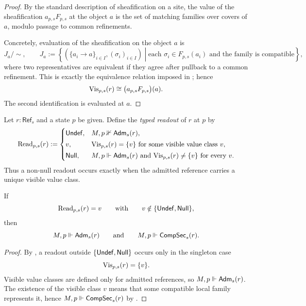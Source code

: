 \begin{proof}
By the standard description of sheafification on a site, the value of the sheafification $a_{p,s}F_{p,s}$ at the object $a$ is the set of matching families over covers of $a$, modulo passage to common refinements.

Concretely, evaluation of the sheafification on the object $a$ is
\[
J_a/\!\sim,\qquad
J_a:=\left\{\left(\{a_i\to a\}_{i\in I},(\sigma_i)_{i\in I}\right)\middle|\text{each }\sigma_i\in F_{p,s}(a_i)\text{ and the family is compatible}\right\},
\]
where two representatives are equivalent if they agree after pullback to a common refinement.
This is exactly the equivalence relation imposed in ; hence
\[
\mathrm{Vis}_{p,s}(r)\cong \bigl(a_{p,s}F_{p,s}\bigr)(a).
\]
The second identification is  evaluated at $a$.
\end{proof}


\begin{definition}\label{def:typed-readout}
Let $r:\mathsf{Ref}_s$ and a state $p$ be given. Define the \emph{typed readout} of $r$ at $p$ by
\[
\Read_{p,s}(r):=
\begin{cases}
\Undef, & M,p\nVdash \Adm_s(r),\\[0.5ex]
v, & \Vis_{p,s}(r)=\{v\}\ \text{for some visible value class }v,\\[0.5ex]
\Null, & M,p\Vdash \Adm_s(r)\ \text{and}\ \Vis_{p,s}(r)\neq\{v\}\ \text{for every }v.
\end{cases}
\]
Thus a non-null readout occurs exactly when the admitted reference carries a unique visible value class.
\end{definition}

\begin{proposition}\label{prop:address-before-value}
If
\[
\mathrm{Read}_{p,s}(r)=v
\qquad\text{with}\qquad
v\notin\{\mathsf{Undef},\mathsf{Null}\},
\]
then
\[
M,p\Vdash \mathsf{Adm}_s(r)
\qquad\text{and}\qquad
M,p\Vdash \mathsf{CompSec}_s(r).
\]
\end{proposition}

\begin{proof}
By , a readout outside $\{\mathsf{Undef},\mathsf{Null}\}$ occurs only in the singleton case
\[
\mathrm{Vis}_{p,s}(r)=\{v\}.
\]
Visible value classes are defined only for admitted references, so $M,p\Vdash \mathsf{Adm}_s(r)$. The existence of the visible class $v$ means that some compatible local family represents it, hence $M,p\Vdash \mathsf{CompSec}_s(r)$ by .
\end{proof}

